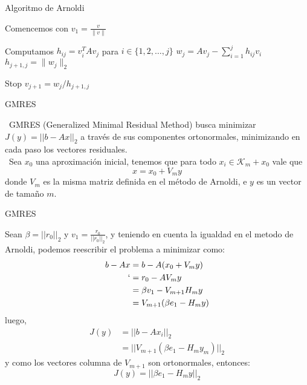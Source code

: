 \documentclass[12pt]{beamer}
\newcommand{\norm}[1]{\left\lVert#1\right\rVert}
\begin{document}
	\begin{frame}
		
		\begin{algorithm}[H]
			\caption{Algoritmo de Arnoldi}\label{algorithm_1}
			\begin{algorithmic}[1]
				\State Comencemos con $v_1=\frac{v}{\norm{v}}$
				
				\State Computamos $h_{ij} = v_i^TAv_j$ para $i \in \{1, 2, \dots, j\}$
				\State $w_j = Av_j - \sum_{i=1}^j h_{ij} v_i$
				\State $h_{j+1,j} = \|w_j\|_2$
				
				\State Stop
				\EndIf
				\EndFor
				\State $v_{j+1} = w_j / h_{j+1,j}$
			\end{algorithmic}
		\end{algorithm}   
		
	\end{frame}
	
	\begin{frame}{GMRES}
		
		\ GMRES (Generalized Minimal Residual Method) busca minimizar $J(y)=||b-Ax||_2$ a través de sus componentes ortonormales, minimizando en cada paso los vectores residuales. \\
		\ Sea $x_0$ una aproximación inicial, tenemos que para todo $x_i\in\mathcal{K}_m+x_0$ vale que $$x=x_0+V_my$$ donde $V_m$ es la misma matriz definida en el método de Arnoldi, e $y$ es un vector de tamaño $m$.
		
	\end{frame}
	
	\begin{frame}{GMRES}
		
		Sean $\beta = ||r_0||_2$ y $v_1=\frac{r_0}{||r_0||_2}$, y teniendo en cuenta la igualdad en el metodo de Arnoldi, podemos reescribir el problema a minimizar como:
		\begin{equation*}
			\begin{split}
				b-Ax&=b-A(x_0+V_my)\\
				`    &= r_0-AV_my\\
				&= \beta v_1-V_{m+1}H_my\\
				&= V_{m+1}(\beta e_1 - H_my)
			\end{split}
		\end{equation*}
		luego, 
		\begin{equation*}
			\begin{split}
				J(y)&=||b-Ax_i||_2\\
				&=||V_{m+1}(\beta e_1 - H_my_m)||_2    
			\end{split}
		\end{equation*}
		y como los vectores columna de $V_{m+1}$ son ortonormales, entonces:
		$$J(y)=||\beta e_1 - H_my||_2$$
		
	\end{frame}
	
\end{document}
